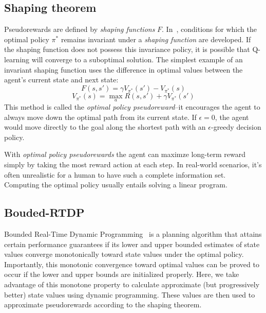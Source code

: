 \documentclass[letterpaper]{article}
\begin{document}
\subsection{Shaping theorem}

Pseudorewards are defined by \textit{shaping functions} $F$.  In~\cite{ng1999policy}, conditions for which the optimal policy $\pi^*$ remains invariant under a \textit{shaping function} are developed. If the shaping function does not possess this invariance policy, it is possible that Q-learning will converge to a suboptimal solution. The simplest example of an invariant shaping function uses the difference in optimal values between the agent's current state and next state:
\begin{equation}
F(s, s') = \gamma V_{\pi^*}(s') - V_{\pi^*}(s) 
\end{equation}
\begin{equation}
V_{\pi^*}(s) =  \max_{a} R(s, s') + \gamma V_{\pi^*}(s')
\end{equation}
This method is called the \textit{optimal policy pseudoreward}--it encourages the agent to always move down the optimal path from its current state. If $\epsilon = 0$, the agent would move directly to the goal along the shortest path with an $\epsilon$-greedy decision policy.

With \textit{optimal policy pseudorewards} the agent can maximze long-term reward simply by taking the most reward action at each step. In real-world scenarios, it's often unrealistic for a human to have such a complete information set. Computing the optimal policy usually entails solving a linear program.

\subsection{Bouded-RTDP}

Bounded Real-Time Dynamic Programming~\cite{mcmahan2005bounded} is a planning algorithm that attains certain performance guarantees if its lower and upper bounded estimates of state values converge monotonically toward state values under the optimal policy. Importantly, this monotonic convergence toward optimal values can be proved to occur if the lower and upper bounds are initialized properly. Here, we take advantage of this monotone property to calculate approximate (but progressively better) state values using dynamic programming. These values are then used to approximate pseudorewards according to the shaping theorem.
\end{document}
